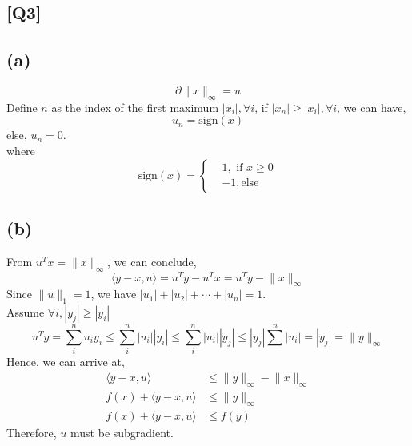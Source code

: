 \documentclass[12pt, a4 paper]{article}
\begin{document}
    \begin{framed}
        \section{[Q3]}
        \subsection{(a)}
        $$
        \partial \lVert x \rVert_{\infty} = u
        $$
        \indent Define $n$ as the index of the first maximum
        $\lvert x_{i} \rvert, \forall i$,
        if $\lvert x_{n} \rvert \geq \lvert x_{i} \rvert,
        \forall i $, we can have,
        $$
        u_{n} = \text{sign}(x)
        $$
        \indent else, $u_{n}=0$.\\
        \indent where $$\text{sign}(x) = \left\{
        \begin{aligned}
            &1, \text{ if } x \geq 0\\
            &-1, \text{else}
        \end{aligned}
        \right.
        $$

        \subsection{(b)}
        From $u^{T}x = \lVert x \rVert_{\infty}$, we can conclude,
        \begin{equation}
            \langle y-x, u \rangle = u^{T}y - u^{T}x = u^{T}y - \lVert x \rVert_{\infty}
        \end{equation}
        \indent Since $\lVert u \rVert_{1}=1$, we have $\lvert u_{1} \rvert + \lvert 
        u_{2} \rvert + \cdots + \lvert u_{n} \rvert = 1$.\\
        \indent Assume $\forall i, |y_{j}| \geq |y_{i}|$
        \begin{equation}
            u^{T}y = \sum\limits_{i}^{n} u_{i}y_{i} \leq \sum\limits_{i}^{n} |u_{i}|
            |y_{i}| \leq \sum\limits_{i}^{n} |u_{i}||y_{j}| \leq |y_{j}| \sum\limits
            ^{n}|u_{i}| = |y_{j}| = \lVert y \rVert_{\infty}
        \end{equation}
        \indent Hence, we can arrive at,
        \begin{align}
            \langle y-x, u \rangle &\leq \lVert y \rVert_{\infty} - 
            \lVert x \rVert_{\infty}\\
            f(x) + \langle y-x, u \rangle &\leq \lVert y \rVert_{\infty}\\
            f(x) + \langle y-x, u \rangle &\leq f(y)
        \end{align}
        \indent Therefore, $u$ must be subgradient.
        

\end{framed}
\end{document}
